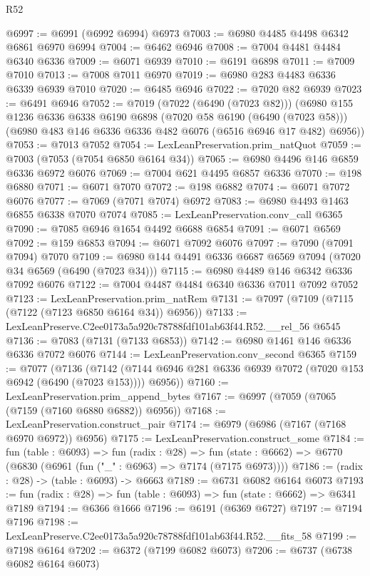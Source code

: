 \begin{lexlean}{R52}
\begin{coremodule}
@6997 := @6991 (@6992 @6994) @6973
@7003 := @6980 @4485 @4498 @6342 @6861 @6970 @6994
@7004 := @6462 @6946
@7008 := @7004 @4481 @4484 @6340 @6336
@7009 := @6071 @6939
@7010 := @6191 @6898
@7011 := @7009 @7010
@7013 := @7008 @7011 @6970
@7019 := @6980 @283 @4483 @6336 @6339 @6939 @7010
@7020 := @6485 @6946
@7022 := @7020 @82 @6939
@7023 := @6491 @6946
@7052 := @7019
    (@7022 (@6490 (@7023 @82)))
    (@6980
      @155
      @1236
      @6336
      @6338
      @6190
      @6898
      (@7020 @58 @6190 (@6490 (@7023 @58)))
      (@6980 @483 @146 @6336 @6336 @482 @6076 (@6516 @6946 @17 @482) @6956))
@7053 := @7013 @7052
@7054 := LexLeanPreservation.prim_natQuot
@7059 := @7003 (@7053 (@7054 @6850 @6164 @34))
@7065 := @6980 @4496 @146 @6859 @6336 @6972 @6076
@7069 := @7004 @621 @4495 @6857 @6336
@7070 := @198 @6880
@7071 := @6071 @7070
@7072 := @198 @6882
@7074 := @6071 @7072 @6076
@7077 := @7069 (@7071 @7074) @6972
@7083 := @6980 @4493 @1463 @6855 @6338 @7070 @7074
@7085 := LexLeanPreservation.conv_call @6365
@7090 := @7085 @6946 @1654 @4492 @6688 @6854
@7091 := @6071 @6569
@7092 := @159 @6853
@7094 := @6071 @7092 @6076
@7097 := @7090 (@7091 @7094) @7070
@7109 := @6980 @144 @4491 @6336 @6687 @6569 @7094 (@7020 @34 @6569 (@6490 (@7023 @34)))
@7115 := @6980 @4489 @146 @6342 @6336 @7092 @6076
@7122 := @7004 @4487 @4484 @6340 @6336 @7011 @7092 @7052
@7123 := LexLeanPreservation.prim_natRem
@7131 := @7097 (@7109 (@7115 (@7122 (@7123 @6850 @6164 @34)) @6956))
@7133 := LexLeanPreserve.C2ee0173a5a920c78788fdf101ab63f44.R52.__rel_56 @6545
@7136 := @7083 (@7131 (@7133 @6853))
@7142 := @6980 @1461 @146 @6336 @6336 @7072 @6076
@7144 := LexLeanPreservation.conv_second @6365
@7159 := @7077
    (@7136
      (@7142 (@7144 @6946 @281 @6336 @6939 @7072 (@7020 @153 @6942 (@6490 (@7023 @153)))) @6956))
@7160 := LexLeanPreservation.prim_append_bytes
@7167 := @6997 (@7059 (@7065 (@7159 (@7160 @6880 @6882)) @6956))
@7168 := LexLeanPreservation.construct_pair
@7174 := @6979 (@6986 (@7167 (@7168 @6970 @6972)) @6956)
@7175 := LexLeanPreservation.construct_some
@7184 := fun (table : @6093) =>
  fun (radix : @28) =>
  fun (state : @6662) => @6770 (@6830 (@6961 (fun ("_" : @6963) => @7174 (@7175 @6973))))
@7186 := (radix : @28) -> (table : @6093) -> @6663
@7189 := @6731 @6082 @6164 @6073
@7193 := fun (radix : @28) => fun (table : @6093) => fun (state : @6662) => @6341 @7189
@7194 := @6366 @1666
@7196 := @6191 (@6369 @6727)
@7197 := @7194 @7196
@7198 := LexLeanPreserve.C2ee0173a5a920c78788fdf101ab63f44.R52.__fits_58
@7199 := @7198 @6164
@7202 := @6372 (@7199 @6082 @6073)
@7206 := @6737 (@6738 @6082 @6164 @6073)

\end{coremodule}
\end{lexlean}
